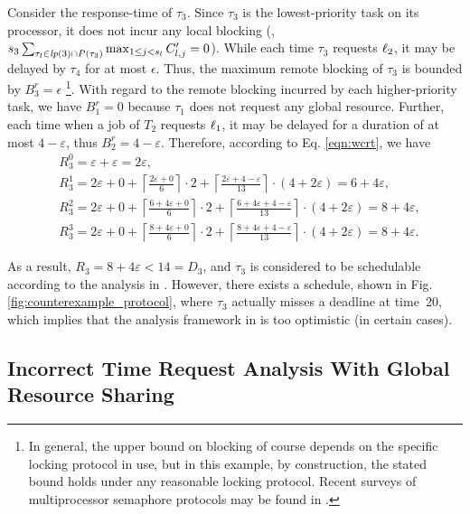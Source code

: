 Consider the response-time of $\tau_3$. Since $\tau_3$ is the lowest-priority task on its processor, it does not incur any local blocking (\ie,$s_3 \sum_{\tau_l \in \mathit{lp}(3) \cap P(\tau_3)} \max_{1 \leq j < s_l} C_{l,j}^{\prime} = 0$). While each time $\tau_3$ requests $\ell_2$, it may be delayed by $\tau_4$ for at most $\epsilon$. Thus, the maximum remote blocking of $\tau_3$ is bounded by $B_3^r = \epsilon$ \footnote{In general, the upper bound on blocking of course depends on the specific locking protocol in use, but in this example, by construction, the stated bound holds under any reasonable locking protocol. Recent surveys of multiprocessor semaphore protocols may be found in \cite{bbb-2013,yang-2015}.}. With regard to the remote blocking incurred by each higher-priority task, we have $B_1^r = 0$ because $\tau_1$ does not request any global resource. Further, each time when a job of $T_2$ requests $\ell_1$, it may be delayed for a duration of at most $4-\varepsilon$, thus $B_2^r = 4-\varepsilon$. Therefore, according to Eq. \ref{eqn:wcrt}, we have
\begin{align*}
& R_3^0 = \varepsilon + \varepsilon = 2\varepsilon, \\
& R_3^1 = 2\varepsilon + 0 + \left \lceil \frac{2\varepsilon + 0}{6} \right \rceil \cdot 2 + \left \lceil \frac{2\varepsilon + 4 - \varepsilon}{13} \right \rceil \cdot (4+2\varepsilon) =  6+4\varepsilon, \\
& R_3^2 = 2\varepsilon + 0 + \left \lceil \frac{6+4\varepsilon + 0}{6} \right \rceil \cdot 2 + \left \lceil \frac{6+4\varepsilon + 4-\varepsilon}{13} \right \rceil \cdot (4+2\varepsilon) = 8+4\varepsilon, \\
& R_3^3 = 2\varepsilon + 0 + \left \lceil \frac{8+4\varepsilon + 0}{6} \right \rceil \cdot 2 + \left \lceil \frac{8+4\varepsilon + 4-\varepsilon}{13} \right \rceil \cdot (4+2\varepsilon) = 8+4\varepsilon.
\end{align*}
 
As a result, $R_3 = 8+4\varepsilon < 14 = D_3$, and $\tau_3$ is considered to be schedulable according to the analysis in \cite{lakshmanan-2009}. However, there exists a schedule, shown in Fig. \ref{fig:counterexample_protocol}, where $\tau_3$  actually misses a deadline at time~20, which implies that the analysis framework in \cite{lakshmanan-2009} is too optimistic (in certain cases). 

\subsection{Incorrect Time Request Analysis With Global Resource Sharing}

